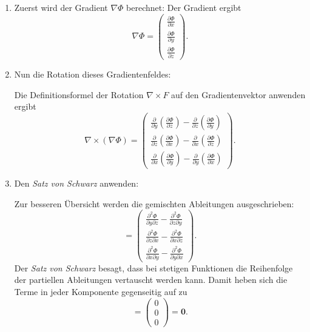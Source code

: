 \begin{enumerate}
    \item Zuerst wird der Gradient $\nabla\Phi$ berechnet:
    Der Gradient ergibt
    $$
    \nabla \Phi =
    \begin{pmatrix}
        \frac{\partial \Phi}{\partial x} \\
        \frac{\partial \Phi}{\partial y} \\
        \frac{\partial \Phi}{\partial z}
    \end{pmatrix}.
    $$

    \item Nun die Rotation dieses Gradientenfeldes:
    
    Die Definitionsformel der Rotation $\nabla \times F$ auf den Gradientenvektor anwenden ergibt
    $$
    \nabla \times (\nabla \Phi) =
    \begin{pmatrix}
        \frac{\partial}{\partial y}\left(\frac{\partial \Phi}{\partial z}\right) - \frac{\partial}{\partial z}\left(\frac{\partial \Phi}{\partial y}\right) \\
        \frac{\partial}{\partial z}\left(\frac{\partial \Phi}{\partial x}\right) - \frac{\partial}{\partial x}\left(\frac{\partial \Phi}{\partial z}\right) \\
        \frac{\partial}{\partial x}\left(\frac{\partial \Phi}{\partial y}\right) - \frac{\partial}{\partial y}\left(\frac{\partial \Phi}{\partial x}\right)
    \end{pmatrix}.
    $$

    \item Den \emph{Satz von Schwarz} anwenden:
    
    Zur besseren Übersicht werden die gemischten Ableitungen ausgeschrieben:
    $$
    =
    \begin{pmatrix}
        \frac{\partial^2 \Phi}{\partial y \partial z} - \frac{\partial^2 \Phi}{\partial z \partial y} \\
        \frac{\partial^2 \Phi}{\partial z \partial x} - \frac{\partial^2 \Phi}{\partial x \partial z} \\
        \frac{\partial^2 \Phi}{\partial x \partial y} - \frac{\partial^2 \Phi}{\partial y \partial x}
    \end{pmatrix}.
    $$
    Der \emph{Satz von Schwarz} besagt, dass bei stetigen Funktionen die Reihenfolge der partiellen Ableitungen vertauscht werden kann. Damit heben sich die Terme in jeder Komponente gegenseitig auf zu
    $$
    =
    \begin{pmatrix}
        0 \\
        0 \\
        0
    \end{pmatrix} = \mathbf{0}.
    $$
\end{enumerate}

